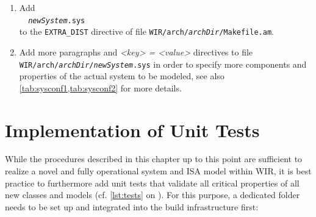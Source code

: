 \begin{enumerate}[resume]
  \item Add \\
  \verb|  |\texttt{\itshape newSystem}\verb|.sys| \\
  to the \texttt{EXTRA\_DIST} directive of file \texttt{WIR/arch/{\itshape archDir}/Makefile.am}.

  \item Add more paragraphs and \textit{<key> = <value>} directives to file \texttt{WIR/arch/{\itshape archDir}/{\itshape newSystem}.sys} in order to specify more components and properties of the actual system to be modeled, see also \cref{tab:sysconf1,tab:sysconf2} for more details.
\end{enumerate}


\section{Implementation of Unit Tests}
\label{sec:newtests}

While the procedures described in this chapter up to this point are sufficient to realize a novel and fully operational system and \gls{ISA} model within \gls{WIR}, it is best practice to furthermore add unit tests that validate all critical properties of all new classes and models (cf. \cref{lst:tests} on ).
For this purpose, a dedicated folder needs to be set up and integrated into the build infrastructure first:

